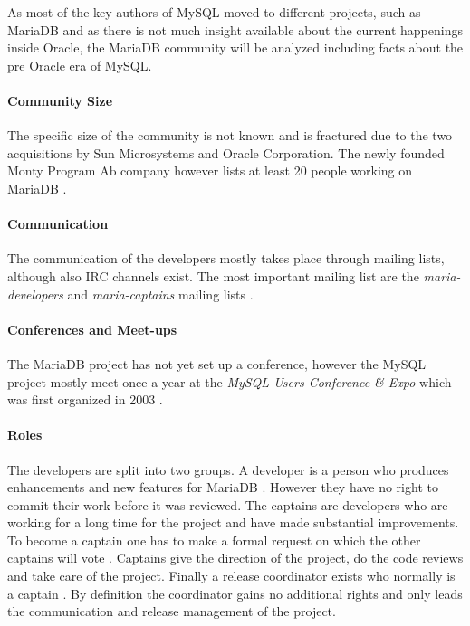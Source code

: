 As most of the key-authors of MySQL moved to different projects, such as
MariaDB and as there is not much insight available about the current happenings
inside Oracle, the MariaDB community will be analyzed including facts about the
pre Oracle era of MySQL.

\paragraph{Community Size}

The specific size of the community is not known and is fractured due to
the two acquisitions by Sun Microsystems and Oracle Corporation. The newly
founded Monty Program Ab company however lists at least 20 people working on
MariaDB \cite{MySQLBehind}.

\paragraph{Communication}

The communication of the developers mostly takes place through mailing lists,
although also \ac{IRC} channels exist. The most important mailing list are the
\emph{maria-developers} and \emph{maria-captains} mailing lists
\cite{MySQLDevelopers}.

\paragraph{Conferences and Meet-ups}

The MariaDB project has not yet set up a conference, however the MySQL project
mostly meet once a year at the \emph{MySQL Users Conference \& Expo} which was
first organized in 2003 \cite{MySQLConference}.

\paragraph{Roles}

The developers are split into two groups. A developer is a person who produces
enhancements and new features for MariaDB
\cite{MySQLContributingCode,MySQLContributing,MySQLCaptain}. However they have
no right to commit their work before it was reviewed. The captains are
developers who are working for a long time for the project and have made
substantial improvements. To become a captain one has to make a formal request
on which the other captains will vote \cite{MySQLCaptain}. Captains give the
direction of the project, do the code reviews and take care of the project.
Finally a release coordinator exists who normally is a captain
\cite{MySQLReleaseCoordinator}. By definition the coordinator gains no
additional rights and only leads the communication and release management of
the project.

